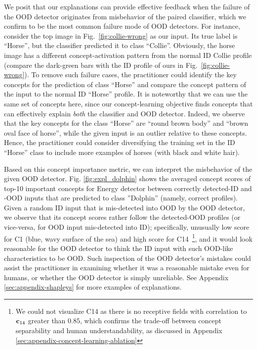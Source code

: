 We posit that our explanations can provide effective feedback when the failure of the OOD detector originates from misbehavior of the paired classifier, which we confirm to be the most common failure mode of OOD detectors. 
For instance, consider the top image in Fig.~\ref{fig:collie-wrong} as our input. Its true label is ``Horse'', but the classifier predicted it to class ``Collie''. Obviously, the horse image has a different concept-activation pattern from the normal ID Collie profile (compare the dark-green bars with the ID profile of ours in Fig.~\ref{fig:collie-wrong}). 
To remove such failure cases, the practitioner could identify the key concepts for the prediction of class ``Horse'' and compare the concept pattern of the input to the normal ID ``Horse'' profile. It is noteworthy that we can use the same set of concepts here, since our concept-learning objective finds concepts that can effectively explain \textit{both} the classifier and OOD detector. Indeed, we observe that the key concepts for the class ``Horse'' are ``round brown body'' and ``brown oval face of horse'', while the given input is an outlier relative to these concepts. 
Hence, the practitioner could consider diversifying the training set in the ID ``Horse'' class to include more examples of horses (\eg with black and white hair).

\iffalse

Based on this concept importance metric, we can interpret the misbehavior of the given OOD detector.
Fig. \ref{fig:expl_dolphin} shows the averaged concept scores of top-10 important concepts for Energy detector between correctly detected-ID and -OOD inputs that are predicted to class ''Dolphin'' (namely, correct profiles).
Given a random ID input that is mis-detected into OOD by the OOD detector, we observe that its concept scores rather follow the detected-OOD profiles (or vice-versa, for OOD input mis-detected into ID); specifically, unusually low score for C1 (blue, wavy surface of the sea) and high score for C14~\footnote{We could not visualize C14 as there is no receptive fields with correlation to $\mathbf{c}_{14}$ greater than $0.85$, which confirms the trade-off between concept separability and human understandability, as discussed in Appendix \ref{sec:appendix-concept-learning-ablation}}, and it would look reasonable for the OOD detector to think the ID input with such OOD-like characteristics to be OOD. 
Such inspection of the OOD detector's mistakes could assist the practitioner in examining whether it was a reasonable mistake even for humans, or whether the OOD detector is simply unreliable. See Appendix \ref{sec:appendix-shapleys} for more examples of explanations.

